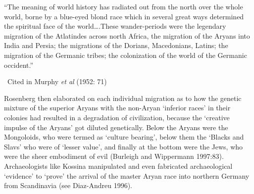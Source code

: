 \begin{myquote}
“The meaning of world history has radiated out from the north over the whole world, borne by a blue-eyed blond race which in several great ways determined the spiritual face of the world….These wander-periods were the legendary migration of the Atlatindes across north Africa, the migration of the Aryans into India and Persia; the migrations of the Dorians, Macedonians, Latins; the migration of the Germanic tribes; the colonization of the world of the Germanic occident.” 

~\hfill Cited in Murphy \textit{et al }(1952: 71)
\end{myquote}

Rosenberg then elaborated on each individual migration as to how the genetic mixture of the superior Aryans with the non-Aryan ‘inferior races’ in their colonies had resulted in a degradation of civilization, because the ‘creative impulse of the Aryans’ got diluted genetically. Below the Aryans were the Mongoloids, who were termed as ‘culture bearing’, below them the ‘Blacks and Slavs’ who were of ‘lesser value’, and finally at the bottom were the Jews, who were the sheer embodiment of evil (Burleigh and Wippermann 1997:83). Archaeologists like Kossina manipulated and even fabricated archaeological ‘evidence’ to ‘prove’ the arrival of the master Aryan race into northern Germany from Scandinavia (see Diaz-Andreu 1996).

